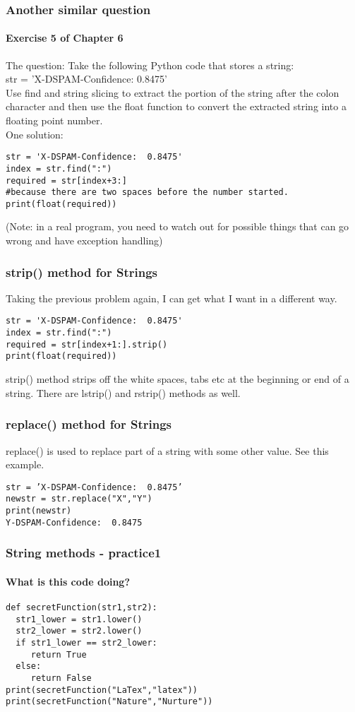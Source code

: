 \documentclass{beamer}
\begin{document}
\begin{frame}[fragile]
\frametitle{Another similar question}
\framesubtitle{Exercise 5 of Chapter 6}
The question: Take the following Python code that stores a string:
\\ str = 'X-DSPAM-Confidence:  0.8475'
\\ Use find and string slicing to extract the portion of the string after the colon character and then use the float function to convert the extracted string into a floating point number. \pause
\medskip \\ One solution: 
\small
\begin{verbatim} 
str = 'X-DSPAM-Confidence:  0.8475'
index = str.find(":")
required = str[index+3:] 
#because there are two spaces before the number started.
print(float(required))
\end{verbatim}
(Note: in a real program, you need to watch out for possible things that can go wrong and have exception handling)
\end{frame}

\begin{frame}[fragile]
\frametitle{strip() method for Strings}
Taking the previous problem again, I can get what I want in a different way.
\begin{verbatim} 
str = 'X-DSPAM-Confidence:  0.8475'
index = str.find(":")
required = str[index+1:].strip() 
print(float(required))
\end{verbatim}

\medskip strip() method strips off the white spaces, tabs etc at the beginning or end of a string. There are lstrip() and rstrip() methods as well. 
\end{frame}

\begin{frame}[fragile]
\frametitle{replace() method for Strings}
replace() is used to replace part of a string with some other value. See this example.
\begin{verbatim}
str = ’X-DSPAM-Confidence:  0.8475’
newstr = str.replace("X","Y")
print(newstr)
Y-DSPAM-Confidence:  0.8475
\end{verbatim}
\end{frame}

\begin{frame}[fragile]
\frametitle{String methods - practice1}
\framesubtitle{What is this code doing?}
\begin{verbatim}
def secretFunction(str1,str2):
  str1_lower = str1.lower()
  str2_lower = str2.lower()
  if str1_lower == str2_lower:
     return True
  else:
     return False
print(secretFunction("LaTex","latex"))
print(secretFunction("Nature","Nurture"))
\end{verbatim}
\end{frame}
\end{document}
